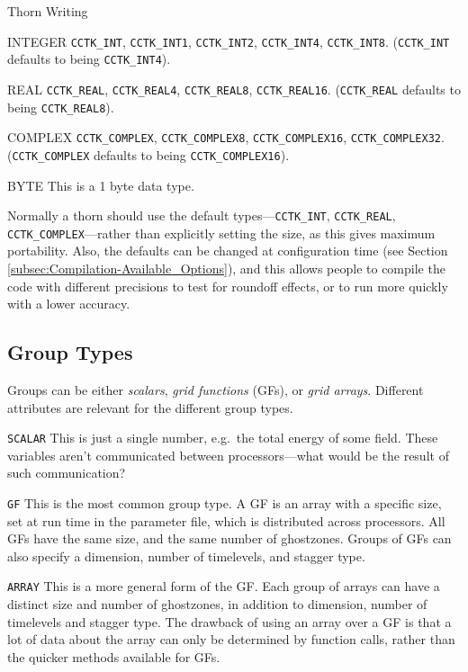\begin{cactuspart}{Thorn Writing}
\begin{Lentry}
\item[INTEGER]
\texttt{CCTK\_INT}, \texttt{CCTK\_INT1}, \texttt{CCTK\_INT2}, \texttt{CCTK\_INT4}, \texttt{CCTK\_INT8}.
(\texttt{CCTK\_INT} defaults to being \texttt{CCTK\_INT4}).
\item[REAL]
\texttt{CCTK\_REAL}, \texttt{CCTK\_REAL4}, \texttt{CCTK\_REAL8}, \texttt{CCTK\_REAL16}.  (\texttt{CCTK\_REAL} defaults to being \texttt{CCTK\_REAL8}).
\item[COMPLEX]
\texttt{CCTK\_COMPLEX}, \texttt{CCTK\_COMPLEX8}, \texttt{CCTK\_COMPLEX16}, \texttt{CCTK\_COMPLEX32}.
(\texttt{CCTK\_COMPLEX} defaults to being \texttt{CCTK\_COMPLEX16}).
\item[BYTE]
This is a 1 byte data type.
\end{Lentry}

Normally a thorn should use the default types---\texttt{CCTK\_INT}, \texttt{CCTK\_REAL}, \texttt{CCTK\_COMPLEX}---rather than explicitly setting the size, as this gives maximum
portability. Also, the defaults can be changed at configuration time (see Section
\ref{subsec:Compilation-Available_Options}), and this allows people to compile the
code with different precisions to test for roundoff effects, or to run more
quickly with a lower accuracy.


\subsection{Group Types}
\label{sec:cactus_variables-groups}

Groups can be either \textit{scalars}, \textit{grid functions} (GFs), or
\textit{grid arrays}. Different attributes are relevant for the different group
types.


\begin{Lentry}
\item[\texttt{SCALAR}]
This is just a single number, e.g.\ the total energy of some field.  These
variables aren't communicated between processors---what would be the
result of such communication?
\item[\texttt{GF}]
This is the most common group type.  A GF is an array with a
specific size, set at run time in the parameter file, which is distributed
across processors.  All GFs have the same size, and the same number of
ghostzones. Groups of GFs can also specify a dimension,
number of timelevels, and stagger type.
\item[\texttt{ARRAY}]
This is a more general form of the GF.  Each group of arrays can have
a distinct size and number of ghostzones, in addition to dimension,
number of timelevels and stagger type.
The drawback of using an array over a GF is that a lot of data about the
array can only be determined by function calls, rather than the
quicker methods available for GFs.
\end{Lentry}


\end{cactuspart}
